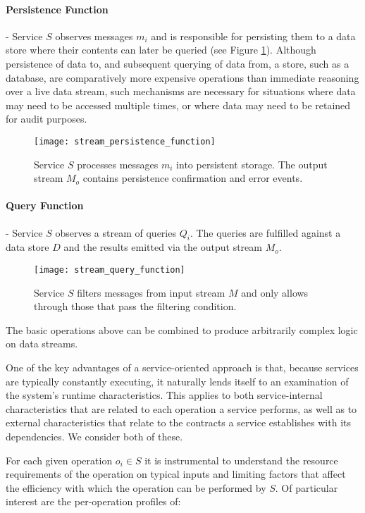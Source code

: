 \paragraph{Persistence Function} - Service $S$ observes messages $m_i$ and is responsible for persisting them to a data store where their contents can later be queried (see Figure \ref{fig:stream_persistence_function}). Although persistence of data to, and subsequent querying of data from, a store, such as a database, are comparatively more expensive operations than immediate reasoning over a live data stream, such mechanisms are necessary for situations where data may need to be accessed multiple times, or where data may need to be retained for audit purposes.

\begin{figure}[H]
\texttt{[image: stream\_persistence\_function]}
\centering
\caption {Service $S$ processes messages $m_i$ into persistent storage. The output stream $M_o$ contains persistence confirmation and error events.}
\label{fig:stream_persistence_function}
\end{figure}
\newpage
\paragraph{Query Function} - Service $S$ observes a stream of queries $Q_i$. The queries are fulfilled against a data store $D$ and the results emitted via the output stream $M_o$.

\begin{figure}[H]
\texttt{[image: stream\_query\_function]}
\centering
\caption {Service $S$ filters messages from input stream $M$ and only allows through those that pass the filtering condition.}
\label{fig:stream_query_function}
\end{figure}

The basic operations above can be combined to produce arbitrarily complex logic on data streams.

One of the key advantages of a service-oriented approach is that, because services are typically constantly executing, it naturally lends itself to an examination of the system's runtime characteristics. This applies to both service-internal characteristics that are related to each operation a service performs, as well as to external characteristics that relate to the contracts a service establishes with its dependencies. We consider both of these.

For each given operation $o_i \in S$ it is instrumental to understand the resource requirements of the operation on typical inputs and limiting factors that affect the efficiency with which the operation can be performed by $S$. Of particular interest are the per-operation profiles of:

